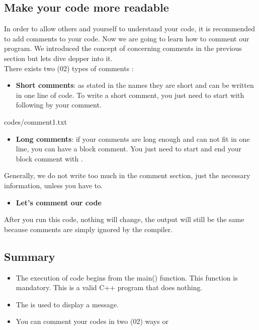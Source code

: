 \documentclass[11pt, a4paper]{article}
\begin{document}
\subsection{Make your code more readable}
In order to allow others and yourself to understand your code, it is recommended to add
comments to your code. Now we are going to learn how to comment our program. We introduced
the concept of concerning comments in the previous section but lets dive depper into it.\\
There exists two (02) types of comments :
\begin{itemize}
\item {\textbf{Short comments}}: as stated in the names they are short and can be written
    in one line of code. To write a short comment, you just need to start with \fbox{\color{green!60!black}//}
    following by your comment.
\end{itemize}

{codes/comment1.txt}

\begin{itemize}
\item {\textbf{Long comments}}: if your comments are long enough and can not fit in one line,
    you can have a block comment. You just need to start and end your block comment
    with \fbox{/*}.
\end{itemize}



\noindent Generally, we do not write too much in the comment section, just the necessary
information, unless you have to.

\begin{itemize}
    \item {\textbf{Let's comment our code}}
\end{itemize}


\noindent After you run this code, nothing will change, the output will still be the same
because comments are simply ignored by the compiler.

\subsection{Summary}
\begin{itemize}
    \item The execution of code begins from the main() function. This function is mandatory.
    This is a valid C++ program that does nothing.
    \item The  is used to display a message.
    \item You can comment your codes in two (02) ways
     or 
\end{itemize}
\end{document}
